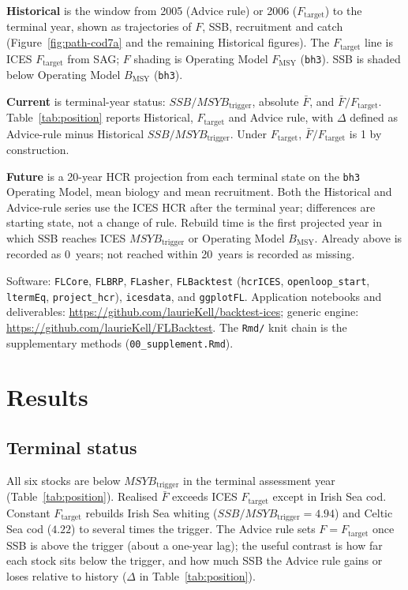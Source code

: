 \documentclass[11pt,a4paper]{article}
\newcommand{\Fmsy}{F_{\mathrm{MSY}}}
\newcommand{\Btrig}{MSYB_{\mathrm{trigger}}}
\newcommand{\Bmsy}{B_{\mathrm{MSY}}}
\newcommand{\Ftar}{F_{\mathrm{target}}}
\begin{document}
\textbf{Historical} is the window from 2005 (Advice rule) or 2006 ($F_{\mathrm{target}}$) to
the terminal year, shown as trajectories of $F$, SSB, recruitment and
catch (Figure~\ref{fig:path-cod7a} and the remaining Historical figures). The
$F_{\mathrm{target}}$ line is ICES $\Ftar$ from SAG; $F$ shading is Operating Model
$\Fmsy$ (\texttt{bh3}). SSB is shaded below Operating Model $\Bmsy$
(\texttt{bh3}).

\textbf{Current} is terminal-year status:
$SSB/\Btrig$, absolute $\bar F$, and $\bar F/\Ftar$.
Table~\ref{tab:position} reports Historical, $F_{\mathrm{target}}$ and Advice rule,
with $\Delta$ defined as Advice-rule minus Historical
$SSB/\Btrig$. Under $F_{\mathrm{target}}$, $\bar F/\Ftar$ is 1 by construction.

\textbf{Future} is a 20-year HCR projection from each terminal state
on the \texttt{bh3} Operating Model, mean biology and mean recruitment.
Both the Historical and Advice-rule series use the ICES HCR after the
terminal year; differences are starting state, not a change of rule.
Rebuild time is the first projected year in which SSB reaches ICES
$\Btrig$ or Operating Model $\Bmsy$. Already above is recorded as
0~years; not reached within 20~years is recorded as missing.

Software: \texttt{FLCore}, \texttt{FLBRP}, \texttt{FLasher},
\texttt{FLBacktest} (\texttt{hcrICES}, \texttt{openloop\_start},
\texttt{ltermEq}, \texttt{project\_hcr}), \texttt{icesdata}, and
\texttt{ggplotFL}. Application notebooks and deliverables:
\url{https://github.com/laurieKell/backtest-ices}; generic engine:
\url{https://github.com/laurieKell/FLBacktest}.
The \texttt{Rmd/} knit chain is the supplementary methods
(\texttt{00\_supplement.Rmd}).

\section{Results}
\label{sec:results}

\subsection{Terminal status}
\label{sec:position}

All six stocks are below $\Btrig$ in the terminal assessment year
(Table~\ref{tab:position}). Realised $\bar F$ exceeds ICES $\Ftar$
except in Irish Sea cod. Constant $\Ftar$ rebuilds Irish Sea whiting
($SSB/\Btrig = 4.94$) and Celtic Sea cod ($4.22$) to several times the
trigger. The Advice rule sets $F = \Ftar$ once SSB is above the trigger
(about a one-year lag); the useful contrast is how far each stock sits
below the trigger, and how much SSB the Advice rule gains or loses
relative to history ($\Delta$ in Table~\ref{tab:position}).
\end{document}
